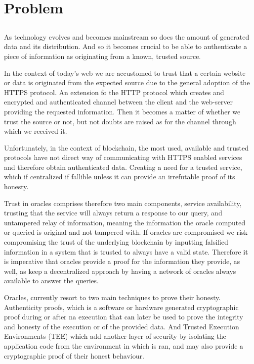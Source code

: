 \chapter{Problem}\label{chap:chap4}

\section*{}
As technology evolves and becomes mainstream so does the amount of generated data and its distribution. And so it becomes crucial to be able to authenticate a piece of information as originating from a known, trusted source. 

In the context of today's web we are accustomed to trust that a certain website or data is originated from the expected source due to the general adoption of the HTTPS protocol. An extension fo the HTTP protocol which creates and encrypted and authenticated channel between the client and the web-server providing the requested information. Then it becomes a matter of whether we trust the source or not, but not doubts are raised as for the channel through which we received it.

Unfortunately, in the context of blockchain, the most used, available and trusted protocols have not direct way of communicating with HTTPS enabled services and therefore obtain authenticated data. Creating a need for a trusted service, which if centralized if fallible unless it can provide an irrefutable proof of its honesty. 

Trust in oracles comprises therefore two main components, service availability, trusting that the service will always return a response to our query, and untampered relay of information, meaning the information the oracle computed or queried is original and not tampered with. If oracles are compromised we risk compromising the trust of the underlying blockchain by inputting falsified information in a system that is trusted to always have a valid state. Therefore it is imperative that oracles provide a proof for the information they provide, as well, as keep a decentralized approach by having a network of oracles always available to answer the queries.

Oracles, currently resort to two main techniques to prove their honesty. Authenticity proofs, which is a software or hardware generated cryptographic proof during or after na execution that can later be used to prove the integrity and honesty of the execution or of the provided data. And Trusted Execution Environments (TEE) which add another layer of security by isolating the application code from the environment in which is ran, and may also provide a cryptographic proof of their honest behaviour.

